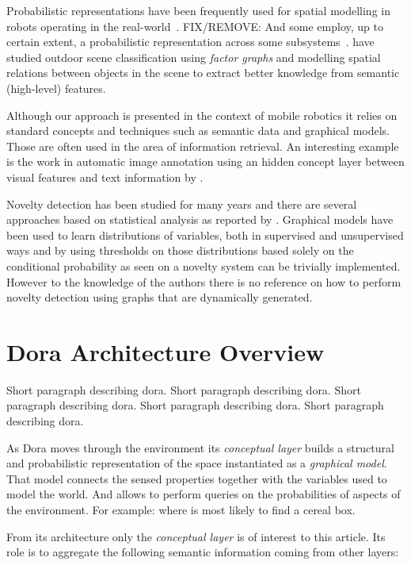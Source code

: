 \documentclass[runningheads,a4paper]{llncs}
\begin{document}
Probabilistic representations have been frequently used for spatial modelling
in robots operating in the real-world~\cite{gross2009toomas,maierprobabilistic}.
FIX/REMOVE: And some employ, up to certain extent, a probabilistic representation across some
subsystems~\cite{kraft2008exploration}.
\cite{boutell2006factor} have studied outdoor scene classification using
\emph{factor graphs} and modelling spatial relations between objects in the scene
to extract better knowledge from semantic (high-level) features.

Although our approach is presented in the context of mobile robotics it relies on
standard concepts and techniques such as semantic data and graphical models.
Those are often used in the area of information retrieval.
An interesting example is the work in automatic image annotation using an hidden
concept layer between visual features and text information by \cite{zhang2005probabilistic}.

Novelty detection has been studied for many years and there are several approaches
based on statistical analysis as reported by \cite{markou2003novelty}.
Graphical models have been used to learn distributions of variables, both in
supervised and unsupervised ways and by using thresholds on those distributions
based solely on the conditional probability as seen on \cite{bishop1994novelty}
a novelty system can be trivially implemented.
However to the knowledge of the authors there is no reference on how to perform
novelty detection using graphs that are dynamically generated.


\section{Dora Architecture Overview}
Short paragraph describing dora. Short paragraph describing dora. Short paragraph describing dora. Short paragraph describing dora. Short paragraph describing dora.

As Dora moves through the environment its \emph{conceptual layer} builds a structural and
probabilistic representation of the space instantiated as a \emph{graphical model}.
That model connects the sensed properties together with the variables used to model the world.
And allows to perform queries on the probabilities of aspects of the environment.
For example: where is most likely to find a cereal box\cite{exploiting}.

From its architecture only the \emph{conceptual layer} is of interest to this article.
Its role is to aggregate the following semantic information coming from other layers:
\end{document}
